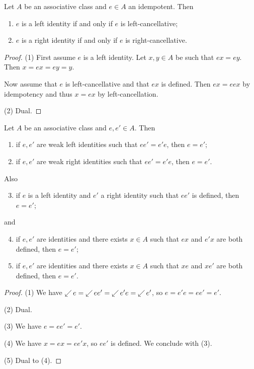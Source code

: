 \begin{lemma}
Let $A$ be an associative class and $e\in A$ an idempotent.
Then
\begin{enumerate}
\item $e$ is a left identity \textup{if and only if} $e$ is left-cancellative;
\item $e$ is a right identity \textup{if and only if} $e$ is right-cancellative.
\end{enumerate}
\end{lemma}
\begin{proof}
(1) First assume $e$ is a left identity. Let $x,y\in A$ be such that $ex = ey$. Then $x = ex = ey = y$.

Now assume that $e$ is left-cancellative and that $ex$ is defined. Then $ex = eex$ by idempotency and thus $x = ex$ by left-cancellation.

(2) Dual.
\end{proof}

\begin{lemma} \label{uniquenessIdentity}
Let $A$ be an associative class and $e,e'\in A$. Then
\begin{enumerate}
\item if $e,e'$ are weak left identities such that $ee' = e'e$, then $e=e'$;
\item if $e,e'$ are weak right identities such that $ee' = e'e$, then $e=e'$.
\end{enumerate}
Also
\begin{enumerate} \setcounter{enumi}{2}
\item if $e$ is a left identity and $e'$ a right identity such that $ee'$ is defined, then $e=e'$;
\end{enumerate}
and
\begin{enumerate} \setcounter{enumi}{3}
\item if $e,e'$ are identities and there exists $x\in A$ such that $ex$ and $e'x$ are both defined, then $e = e'$;
\item if $e,e'$ are identities and there exists $x\in A$ such that $xe$ and $xe'$ are both defined, then $e = e'$.
\end{enumerate}
\end{lemma}
\begin{proof}
(1) We have $\mathop{\swarrow}e = \mathop{\swarrow}ee' = \mathop{\swarrow}e'e = \mathop{\swarrow}e'$, so $e = e'e = ee' = e'$.

(2) Dual.

(3) We have $e = ee' = e'$.

(4) We have $x = ex = ee'x$, so $ee'$ is defined. We conclude with (3).

(5) Dual to (4).
\end{proof}

